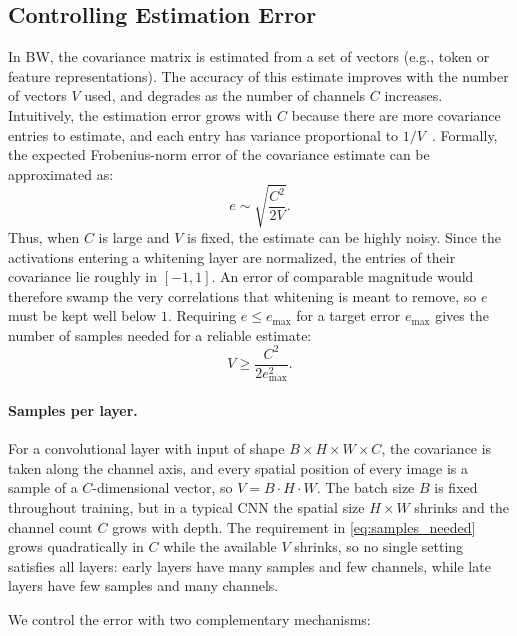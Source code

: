 %
%
%
%

\subsection{Controlling Estimation Error}

In BW, the covariance matrix is estimated from a set of vectors (e.g., token or feature representations).  
The accuracy of this estimate improves with the number of vectors $V$ used, and degrades as the number of channels $C$ increases.  
Intuitively, the estimation error grows with $C$ because there are more covariance entries to estimate, and each entry has variance proportional to $1/V$~\cite{ledoit2004well,huang2018decorrelated}.  
Formally, the expected Frobenius-norm error of the covariance estimate can be approximated as:
\begin{equation}
e \sim \sqrt{\frac{C^2}{2V}}.
\label{eq:cov_error}
\end{equation}
Thus, when $C$ is large and $V$ is fixed, the estimate can be highly noisy.
Since the activations entering a whitening layer are normalized, the entries of their covariance lie roughly in $[-1,1]$.
An error of comparable magnitude would therefore swamp the very correlations that whitening is meant to remove, so $e$ must be kept well below $1$.
Requiring $e \le e_{\max}$ for a target error $e_{\max}$ gives the number of samples needed for a reliable estimate:
\begin{equation}
V \ge \frac{C^2}{2 e_{\max}^2}.
\label{eq:samples_needed}
\end{equation}

\paragraph{Samples per layer.}
For a convolutional layer with input of shape $B \times H \times W \times C$, the covariance is taken along the channel axis, and every spatial position of every image is a sample of a $C$-dimensional vector, so $V = B \cdot H \cdot W$.
The batch size $B$ is fixed throughout training, but in a typical CNN the spatial size $H \times W$ shrinks and the channel count $C$ grows with depth.
The requirement in \eqref{eq:samples_needed} grows quadratically in $C$ while the available $V$ shrinks, so no single setting satisfies all layers: early layers have many samples and few channels, while late layers have few samples and many channels.

We control the error with two complementary mechanisms:

